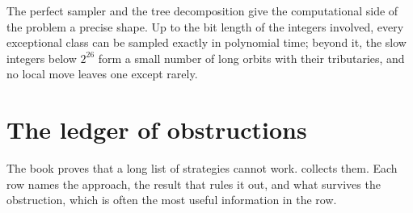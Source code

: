 The perfect sampler and the tree decomposition give the computational side of
the problem a precise shape. Up to the bit length of the integers involved,
every exceptional class can be sampled exactly in polynomial time; beyond it, the
slow integers below $2^{26}$ form a small number of long orbits with their tributaries, and no
local move leaves one except rarely.

\section{The ledger of obstructions}\label{sec:ch10d:obstructions}

The book proves that a long list of strategies cannot work.
 collects them. Each row names the approach, the
result that rules it out, and what survives the obstruction, which is often the
most useful information in the row.

